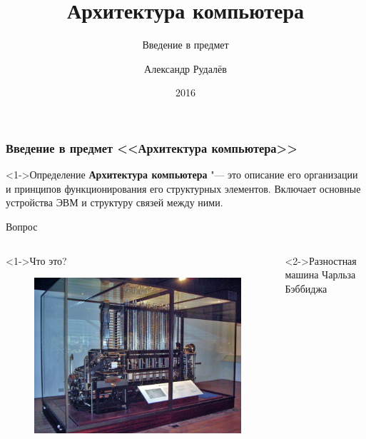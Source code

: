 \documentclass[pdf,9pt,aspectratio=169]{beamer}
\title[]{Архитектура компьютера}
\subtitle{Введение в предмет}
\author[]{Александр Рудалёв}
\institute[]{ИМИКТ САФУ}
\date[]{2016}
\begin{document}
\frame{\titlepage}

\begin{frame}\frametitle{Введение в предмет <<Архитектура компьютера>>}
  \begin{block}<1->{Определение}
    \textbf{Архитектура компьютера} "---  это описание его организации и принципов функционирования его структурных элементов. Включает основные устройства ЭВМ и структуру связей между ними.
  \end{block}
\end{frame}

\begin{frame}{Вопрос}
  \begin{columns}[T]
    \begin{column}[T]{5cm}  
      \begin{alertblock}<1->{Что это?}
        \begin{figure}
          \includegraphics[width=\textwidth]{images/DifferenceEngine.jpg}
        \end{figure}
      \end{alertblock}
    \end{column}
    \begin{column}[T]{8cm}
      \begin{exampleblock}<2->{Разностная машина Чарльза Бэббиджа}
        \begin{columns}[]
          \column{2cm}

\end{columns}
\end{exampleblock}
\end{column}
\end{columns}
\end{frame}
\end{document}
